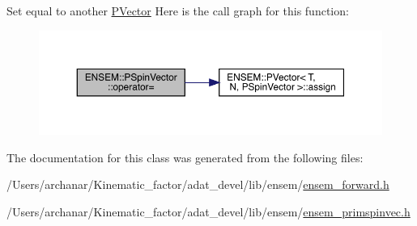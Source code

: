 Set equal to another \mbox{\hyperlink{classENSEM_1_1PVector}{P\+Vector}} Here is the call graph for this function\+:
\nopagebreak
\begin{figure}[H]
\begin{center}
\leavevmode
\includegraphics[width=350pt]{d0/dce/classENSEM_1_1PSpinVector_a6c7a984a7ab5ad8939e0a9bc57a93660_cgraph}
\end{center}
\end{figure}


The documentation for this class was generated from the following files\+:\begin{DoxyCompactItemize}
\item 
/\+Users/archanar/\+Kinematic\+\_\+factor/adat\+\_\+devel/lib/ensem/\mbox{\hyperlink{lib_2ensem_2ensem__forward_8h}{ensem\+\_\+forward.\+h}}\item 
/\+Users/archanar/\+Kinematic\+\_\+factor/adat\+\_\+devel/lib/ensem/\mbox{\hyperlink{lib_2ensem_2ensem__primspinvec_8h}{ensem\+\_\+primspinvec.\+h}}\end{DoxyCompactItemize}
